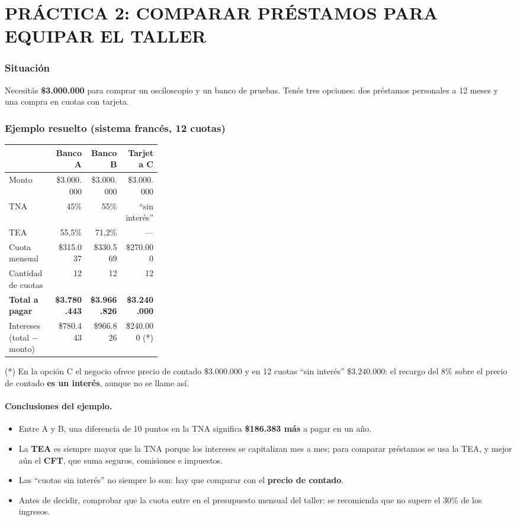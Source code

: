 \section*{PRÁCTICA 2: COMPARAR PRÉSTAMOS PARA EQUIPAR EL TALLER}

\subsubsection*{Situación}
Necesitás \textbf{\$3.000.000} para comprar un osciloscopio y un banco de pruebas. Tenés tres
opciones: dos préstamos personales a 12 meses y una compra en cuotas con tarjeta.

\subsubsection*{Ejemplo resuelto (sistema francés, 12 cuotas)}
\begin{center}
\small
\begin{tabular}{|p{0.30\linewidth}|r|r|r|}
\hline
 & \textbf{Banco A} & \textbf{Banco B} & \textbf{Tarjeta C} \\ \hline
Monto & \$3.000.000 & \$3.000.000 & \$3.000.000 \\ \hline
TNA & 45\% & 55\% & ``sin interés'' \\ \hline
TEA & 55,5\% & 71,2\% & --- \\ \hline
Cuota mensual & \$315.037 & \$330.569 & \$270.000 \\ \hline
Cantidad de cuotas & 12 & 12 & 12 \\ \hline
\textbf{Total a pagar} & \textbf{\$3.780.443} & \textbf{\$3.966.826} & \textbf{\$3.240.000} \\ \hline
Intereses (total $-$ monto) & \$780.443 & \$966.826 & \$240.000 (*) \\ \hline
\end{tabular}
\end{center}
{\footnotesize (*) En la opción C el negocio ofrece precio de contado \$3.000.000 y en 12 cuotas
``sin interés'' \$3.240.000: el recargo del 8\% sobre el precio de contado \textbf{es un
interés}, aunque no se llame así.}

\paragraph*{Conclusiones del ejemplo.}
\begin{itemize}
  \item Entre A y B, una diferencia de 10 puntos en la TNA significa \textbf{\$186.383 más}
        a pagar en un año.
  \item La \textbf{TEA} es siempre mayor que la TNA porque los intereses se capitalizan mes a
        mes; para comparar préstamos se usa la TEA, y mejor aún el \textbf{CFT}, que suma
        seguros, comisiones e impuestos.
  \item Las ``cuotas sin interés'' no siempre lo son: hay que comparar con el \textbf{precio de
        contado}.
  \item Antes de decidir, comprobar que la cuota entre en el presupuesto mensual del taller:
        se recomienda que no supere el 30\% de los ingresos.
\end{itemize}


